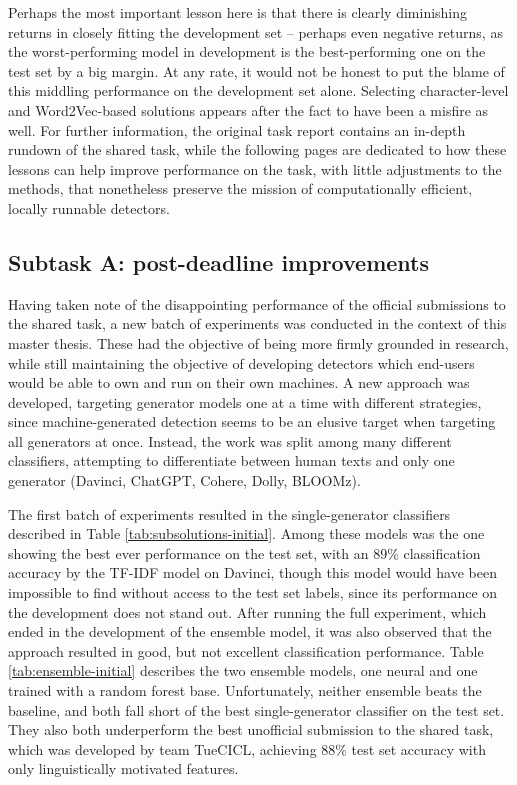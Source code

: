 Perhaps the most important lesson here is that there is clearly diminishing returns in closely fitting the development set -- perhaps even negative returns, as the worst-performing model in development is the best-performing one on the test set by a big margin.
At any rate, it would not be honest to put the blame of this middling performance on the development set alone.
Selecting character-level and Word2Vec-based solutions appears after the fact to have been a misfire as well.
For further information, the original task report \citep{stuhlinger-winkler-2024-tuecicl} contains an in-depth rundown of the shared task, while the following pages are dedicated to how these lessons can help improve performance on the task, with little adjustments to the methods, that nonetheless preserve the mission of computationally efficient, locally runnable detectors.

\subsection{Subtask A: post-deadline improvements}

Having taken note of the disappointing performance of the official submissions to the shared task, a new batch of experiments was conducted in the context of this master thesis.
These had the objective of being more firmly grounded in research, while still maintaining the objective of developing detectors which end-users would be able to own and run on their own machines.
A new approach was developed, targeting generator models one at a time with different strategies, since machine-generated detection seems to be an elusive target when targeting all generators at once.
Instead, the work was split among many different classifiers, attempting to differentiate between human texts and only one generator (Davinci, ChatGPT, Cohere, Dolly, BLOOMz).

The first batch of experiments resulted in the single-generator classifiers described in Table \ref{tab:subsolutions-initial}.
Among these models was the one showing the best ever performance on the test set, with an 89\% classification accuracy by the TF-IDF model on Davinci, though this model would have been impossible to find without access to the test set labels, since its performance on the development does not stand out.
After running the full experiment, which ended in the development of the ensemble model, it was also observed that the approach resulted in good, but not excellent classification performance.
Table \ref{tab:ensemble-initial} describes the two ensemble models, one neural and one trained with a random forest base.
Unfortunately, neither ensemble beats the baseline, and both fall short of the best single-generator classifier on the test set.
They also both underperform the best unofficial submission to the shared task, which was developed by team TueCICL, achieving 88\% test set accuracy with only linguistically motivated features.

